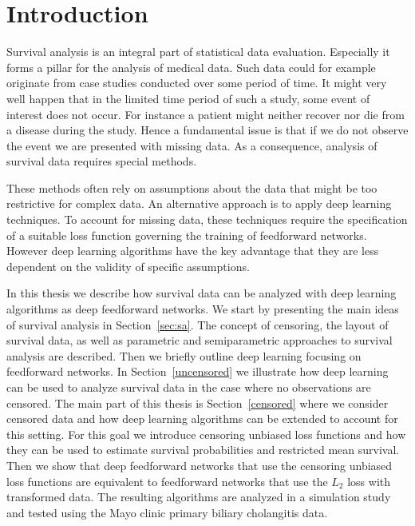 \documentclass[12pt, a4paper]{scrartcl}
\theoremstyle{definition}
\theoremstyle{plain}
\numberwithin{equation}{section}
\numberwithin{figure}{section}
\numberwithin{table}{section}
\begin{document}
	
	\thispagestyle{plain}
	\tableofcontents
	\enlargethispage{3em}
	\newpage

	
	\section{Introduction} \label{introduction}
	
	Survival analysis is an integral part of statistical data evaluation.
	Especially it forms a pillar for the analysis of medical data.
	Such data could for example originate from case studies conducted over some period of time. %
	It might very well happen that in the limited time period of such a study, some event of interest does not occur. 
	For instance a patient might neither recover nor die from a disease during the study.
	Hence a fundamental issue is that if we do not observe the event we are presented with missing data.
	As a consequence, analysis of survival data requires special methods. %
	
	These methods often rely on assumptions about the data that might be too restrictive for complex data.
	An alternative approach is to apply deep learning techniques. %
	To account for missing data, these techniques require the specification of a suitable loss function governing the training of feedforward networks.
	However deep learning algorithms have the key advantage that they are less dependent on the validity of specific assumptions.

	In this thesis we describe how survival data can be analyzed with deep learning algorithms as deep feedforward networks.
	We start by presenting the main ideas of survival analysis in Section~\ref{sec:sa}.
	The concept of censoring, the layout of survival data, as well as parametric and semiparametric approaches to survival analysis are described.
	Then we briefly outline deep learning focusing on feedforward networks.
	In Section~\ref{uncensored} we illustrate how deep learning can be used to analyze survival data in the case where no observations are censored.
	The main part of this thesis is Section~\ref{censored} where we consider censored data and how deep learning algorithms can be extended to account for this setting.
	For this goal we introduce censoring unbiased loss functions and how they can be used to estimate survival probabilities and restricted mean survival.
	Then we show that deep feedforward networks that use the censoring unbiased loss functions are equivalent to feedforward networks that use the $L_2$ loss with transformed data.
	The resulting algorithms are analyzed in a simulation study and tested using the Mayo clinic primary biliary cholangitis data. 
	\newpage
	
\end{document}
